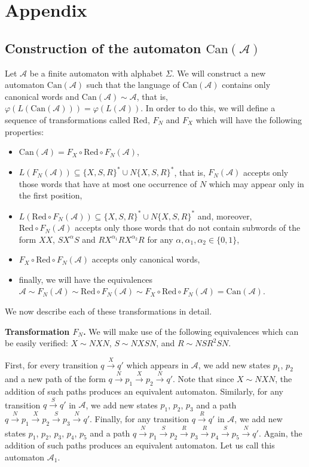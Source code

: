 \documentclass[fontsize=11pt,DIV=13,paper=letter]{scrartcl}
\theoremstyle{definition}
\newcommand{\sub}{\subseteq}
\newcommand{\A}{\mathcal{A}}
\renewcommand{\phi}{\varphi}
\begin{document}
\section{Appendix}

\subsection{Construction of the automaton $\mathrm{Can}(\A)$}\label{Can}
Let $\A$ be a finite automaton with alphabet $\Sigma$. We will construct a new automaton $\mathrm{Can}(\A)$ such that the language of $\mathrm{Can}(\A)$ contains only canonical words and $\mathrm{Can}(\A)\sim \A$, that is, $\phi(L(\mathrm{Can}(\A)))=\phi(L(\A))$. In order to do this, we will define a sequence of transformations called $\mathrm{Red}$, $F_N$ and $F_X$ which will have the following properties:
\begin{itemize}
\item $\mathrm{Can}(\A) = F_X\circ \mathrm{Red} \circ F_N(\A)$,
\item $L(F_N(\A)) \sub {\{X,S,R\}}^*\cup N{\{X,S,R\}}^*$, that is, $F_N(\A)$ accepts only those words that have at most one occurrence of $N$ which may appear only in the first position,
\item $L(\mathrm{Red} \circ F_N(\A))\sub {\{X,S,R\}}^*\cup N{\{X,S,R\}}^*$ and, moreover, $\mathrm{Red} \circ F_N(\A)$ accepts only those words that do not contain subwords of the form $\mathit{XX}$, $SX^\alpha S$ and $RX^{\alpha_1}RX^{\alpha_2}R$ for any $\alpha,\alpha_1,\alpha_2\in \{0,1\}$,
\item $F_X\circ \mathrm{Red} \circ F_N(\A)$ accepts only canonical words,
\item finally, we will have the equivalences $\A\sim F_N(\A)\sim \mathrm{Red} \circ F_N(\A)\sim F_X\circ \mathrm{Red} \circ F_N(\A) = \mathrm{Can}(\A)$.
\end{itemize}
We now describe each of these transformations in detail.

{\bf Transformation $F_N$.} We will make use of the following equivalences which can be easily verified: $X\sim \mathit{NXN}$, $S\sim \mathit{NXSN}$, and $R\sim \mathit{NS}R^2\mathit{SN}$.

First, for every transition $q\xrightarrow{X} q'$ which appears in $\A$, we add new states $p_1$, $p_2$ and a new path of the form $q\xrightarrow{N} p_1\xrightarrow{X} p_2\xrightarrow{N} q'$. Note that since $X\sim \mathit{NXN}$, the addition of such paths produces an equivalent automaton. Similarly, for any transition $q\xrightarrow{S} q'$ in $\A$, we add new states $p_1$, $p_2$, $p_3$ and a path $q\xrightarrow{N} p_1\xrightarrow{X} p_2\xrightarrow{S} p_3\xrightarrow{N} q'$. Finally, for any transition $q\xrightarrow{R} q'$ in $\A$, we add new states $p_1$, $p_2$, $p_3$, $p_4$, $p_5$ and a path $q\xrightarrow{N} p_1\xrightarrow{S} p_2\xrightarrow{R} p_3\xrightarrow{R} p_4\xrightarrow{S} p_5\xrightarrow{N} q'$. Again, the addition of such paths produces an equivalent automaton. Let us call this automaton $\A_1$.
\end{document}
